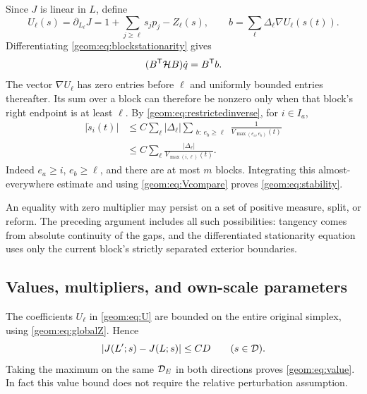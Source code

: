 Since \(J\) is linear in \(L\), define
\begin{equation}
 U_\ell(s)=\partial_{L_\ell}J
    =1+\sum_{j\ge\ell}s_jp_j-Z_\ell(s),\qquad
 b=\sum_\ell\Delta_\ell\nabla U_\ell(s(t)).
                                                        \label{geom:eq:U}
\end{equation}
Differentiating \eqref{geom:eq:blockstationarity} gives
\begin{equation}
 (B^{\mathsf T}\mathcal H B)\dot q=B^{\mathsf T}b.     \label{geom:eq:blockODE}
\end{equation}
The vector \(\nabla U_\ell\) has zero entries before \(\ell\) and
uniformly bounded entries thereafter.  Its sum over a block can
therefore be nonzero only when that block's right endpoint is at
least \(\ell\).  By \eqref{geom:eq:restrictedinverse}, for \(i\in I_a\),
\begin{align}
 |\dot s_i(t)|
 &\le C\sum_\ell|\Delta_\ell|
      \sum_{\substack{b:\ e_b\ge\ell}}
                   \frac1{V_{\max(e_a,e_b)}(t)}\nonumber\\
 &\le C\sum_\ell\frac{|\Delta_\ell|}
                         {V_{\max(i,\ell)}(t)}.  \label{geom:eq:derivstability}
\end{align}
Indeed \(e_a\ge i\), \(e_b\ge\ell\), and there are at most \(m\)
blocks.  Integrating this almost-everywhere estimate and using
\eqref{geom:eq:Vcompare} proves \eqref{geom:eq:stability}.

\begin{remark}
An equality with zero multiplier may persist on a set of positive
measure, split, or reform.  The preceding argument includes all such
possibilities: tangency comes from absolute continuity of the gaps,
and the differentiated stationarity equation uses only the current
block's strictly separated exterior boundaries.
\end{remark}

\subsection{Values, multipliers, and own-scale parameters}

The coefficients \(U_\ell\) in \eqref{geom:eq:U} are bounded on the entire
original simplex, using \eqref{geom:eq:globalZ}.  Hence
\[
 |J(L';s)-J(L;s)|\le CD\qquad(s\in\mathcal D).
\]
Taking the maximum on the same \(\mathcal D_E\) in both directions proves
\eqref{geom:eq:value}.  In fact this value bound does not require the
relative perturbation assumption.

